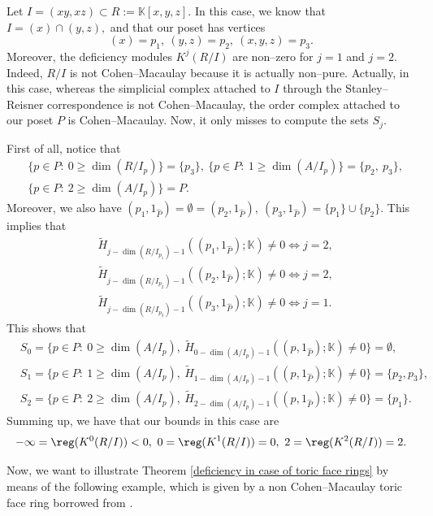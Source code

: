 \documentclass[11pt]{amsart}
\begin{document}
\begin{ex}
Let $I=(xy,xz)\subset R:=\mathbb{K}[x,y,z].$ In this case, we know that $I=(x)\cap (y,z),$ and that our poset has vertices
\[
(x)=p_1,\ (y,z)=p_2,\ (x,y,z)=p_3.
\]
Moreover, the deficiency modules $K^j (R/I)$ are non--zero for $j=1$ and $j=2.$ Indeed, $R/I$ is not Cohen--Macaulay because it is actually non--pure. Actually, in this case, whereas the simplicial complex attached to $I$ through the Stanley--Reisner correspondence is not Cohen--Macaulay, the order complex attached to our poset $P$ is Cohen--Macaulay. Now, it only misses to compute the sets $S_j$.

First of all, notice that
\begin{align*}
& \{p\in P:\ 0\geq\dim (R/I_p)\}=\{p_3\},\ \{p\in P:\ 1\geq\dim (A/I_p)\}=\{p_2,\ p_3\},\\
& \{p\in P:\ 2\geq\dim (A/I_p)\}=P.
\end{align*}
Moreover, we also have $(p_1,1_{\widehat{P}})=\emptyset=(p_2,1_{\widehat{P}}),\ (p_3,1_{\widehat{P}})=\{p_1\}\cup\{p_2\}$. This implies that
\begin{align*}
& \widetilde{H}_{j-\dim (R/I_{p_1})-1}((p_1,1_{\widehat{P}});\mathbb{K})\neq 0\Longleftrightarrow j=2,\\
& \widetilde{H}_{j-\dim (R/I_{p_2})-1}((p_2,1_{\widehat{P}});\mathbb{K})\neq 0\Longleftrightarrow j=2,\\
& \widetilde{H}_{j-\dim (R/I_{p_3})-1}((p_3,1_{\widehat{P}});\mathbb{K})\neq 0\Longleftrightarrow j=1.
\end{align*}
This shows that
\begin{align*}
& S_0=\{p\in P:\ 0\geq\dim (A/I_p),\ \widetilde{H}_{0-\dim(A/I_p)-1}((p,1_{\widehat{P}});\mathbb{K})\neq 0\}=\emptyset,\\
& S_1=\{p\in P:\ 1\geq\dim (A/I_p),\ \widetilde{H}_{1-\dim(A/I_p)-1}((p,1_{\widehat{P}});\mathbb{K})\neq 0\}=\{p_2, p_3\},\\
& S_2=\{p\in P:\ 2\geq\dim (A/I_p),\ \widetilde{H}_{2-\dim(A/I_p)-1}((p,1_{\widehat{P}});\mathbb{K})\neq 0\}=\{p_1\}.
\end{align*}
Summing up, we have that our bounds in this case are
\[
-\infty=\reg(K^0 (R/I))<0,\ 0=\reg (K^1 (R/I))=0,\ 2=\reg (K^2 (R/I))=2.
\]
\end{ex}

Now, we want to illustrate Theorem \ref{deficiency in case of toric face rings} by means of the following example, which is given by a non Cohen--Macaulay toric face ring borrowed from \cite[Example 4.2.3]{HopNguyenthesis}.
\end{document}

